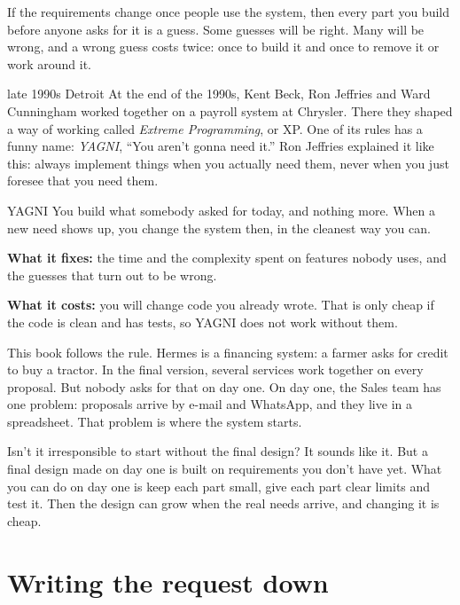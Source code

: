 If the requirements change once people use the system, then every part you
build before anyone asks for it is a guess. Some guesses will be right. Many
will be wrong, and a wrong guess costs twice: once to build it and once to
remove it or work around it.

\begin{history}{late 1990s \textperiodcentered{} Detroit}
At the end of the 1990s, Kent Beck, Ron Jeffries and Ward Cunningham worked
together on a payroll system at Chrysler. There they shaped a way of working
called \emph{Extreme Programming}, or XP. One of its rules has a funny name:
\emph{YAGNI}, ``You aren't gonna need it.'' Ron Jeffries explained it like
this: always implement things when you actually need them, never when you just
foresee that you need them.
\end{history}

\begin{concept}{YAGNI}
You build what somebody asked for today, and nothing more. When a new need
shows up, you change the system then, in the cleanest way you can.

\textbf{What it fixes:} the time and the complexity spent on features nobody
uses, and the guesses that turn out to be wrong.

\textbf{What it costs:} you will change code you already wrote. That is only
cheap if the code is clean and has tests, so YAGNI does not work without them.
\end{concept}

This book follows the rule. Hermes is a financing system: a farmer asks for
credit to buy a tractor. In the final version, several services work together
on every proposal. But nobody asks for that on day one. On day one, the Sales
team has one problem: proposals arrive by e-mail and WhatsApp, and they live in
a spreadsheet. That problem is where the system starts.

\begin{reflection}{Isn't it irresponsible to start without the final design?}
It sounds like it. But a final design made on day one is built on
requirements you don't have yet. What you can do on day one is keep each
part small, give each part clear limits and test it. Then the design can grow
when the real needs arrive, and changing it is cheap.
\end{reflection}

\section{Writing the request down}

